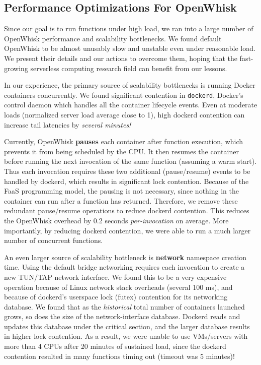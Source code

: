 \subsection{Performance Optimizations For OpenWhisk}

Since our goal is to run functions under high load, we ran into a large number of OpenWhisk performance and scalability bottlenecks.
We found default OpenWhisk to be almost unusably slow and unstable even under reasonable load. 
We present their details and our actions to overcome them, hoping that the fast-growing serverless computing research field can benefit from our lessons. 


In our experience, the primary source of scalability bottlenecks is running Docker containers concurrently.
We found significant contention in \texttt{dockerd}, Docker's control daemon which handles all the container lifecycle events.
Even at moderate loads (normalized server load average close to 1), high dockerd contention can increase tail latencies by \emph{several minutes!}


Currently, OpenWhisk \textbf{pauses} each container after function execution, which prevents it from being scheduled by the CPU.
It then resumes the container before running the next invocation of the same function (assuming a warm start).
Thus each invocation requires these two additional (pause/resume) events to be handled by dockerd, which results in significant lock contention.
Because of the FaaS programming model, the pausing is not necessary, since nothing in the container can run after a function has returned.
Therefore, we remove these redundant pause/resume operations to reduce dockerd contention.
This reduces the OpenWhisk overhead by 0.2 seconds \emph{per-invocation} on average.
More importantly, by reducing dockerd contention, we were able to run a much larger number of concurrent functions. 

An even larger source of scalability bottleneck is \textbf{network} namespace creation time.
Using the default bridge networking requires each invocation to create a new TUN/TAP network interface.
We found this to be a very expensive operation because of Linux network stack overheads (several 100 ms), and because of dockerd's userspace lock (futex) contention for its networking database. 
We found that as the \emph{historical} total number of containers launched grows, so does the size of the network-interface database.
Dockerd reads and updates this database under the critical section, and the larger database results in higher lock contention.
As a result, we were unable to use VMs/servers with more than 4 CPUs after 20 minutes of sustained load, since the dockerd contention resulted in many functions timing out (timeout was 5 minutes)! 

